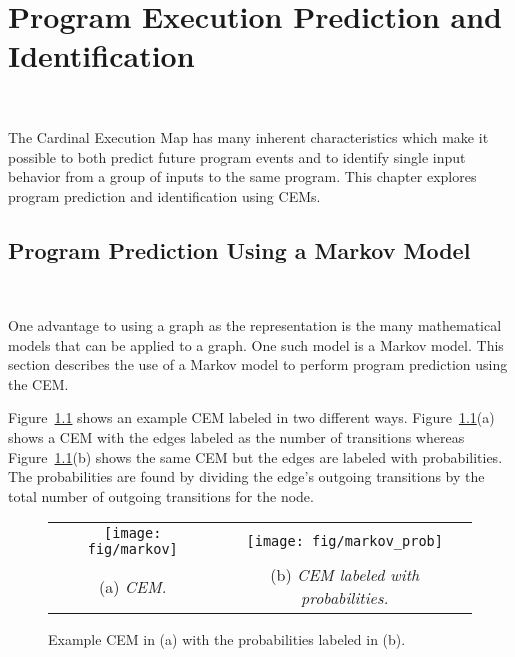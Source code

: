 \chapter{Program Execution Prediction and Identification}~\label{chap:prediction}

The Cardinal Execution Map has many inherent characteristics which make it
possible to both predict future program events and to identify single input
behavior from a group of inputs to the same program. This chapter explores
program prediction and identification using CEMs.

\section{Program Prediction Using a Markov Model}~\label{sec:pred_markov}

One advantage to using a graph as the representation is the many
mathematical models that can be applied to a graph. One such model is
a Markov model. This section describes the use of a Markov model to
perform program prediction using the CEM.

Figure~\ref{fig:markov_cem} shows an example CEM labeled in two
different ways.  Figure~\ref{fig:markov_cem}(a) shows a CEM with the
edges labeled as the number of transitions whereas
Figure~\ref{fig:markov_cem}(b) shows the same CEM but the edges are
labeled with probabilities. The probabilities are found by dividing
the edge's outgoing transitions by the total number of outgoing
transitions for the node.

\begin{figure}[t!]
    \centering
    \begin{tabular}{cc}
        \centering
        \begin{minipage}{0.5\textwidth}
        \centering
        \texttt{[image: fig/markov]}
        \hspace{2pt}
        \end{minipage}
        &
        \begin{minipage}{0.5\textwidth}
        \centering
        \texttt{[image: fig/markov\_prob]}
        \end{minipage}

    \\ (a) \textit{CEM.} & (b) \textit{CEM labeled with probabilities.}
    \end{tabular}
    \caption{Example CEM in (a) with the probabilities labeled in (b).}
    \label{fig:markov_cem}
\end{figure}

